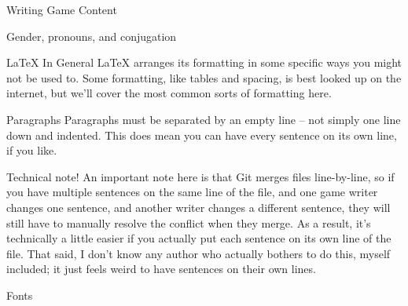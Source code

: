 \documentclass[11pt]{article}
\begin{document}
\begin{section}{Writing Game Content}
\begin{subsection}{Gender, pronouns, and conjugation}
\end{subsection}
\begin{subsection}{\LaTeX{} In General}
LaTeX arranges its formatting in some specific ways you might not be used to.  Some formatting, like tables and spacing, is best looked up on the internet, but we'll cover the most common sorts of formatting here.

\begin{subsubsection}{Paragraphs}
Paragraphs must be separated by an empty line – not simply one line down and indented.  This does mean you can have every sentence on its own line, if you like.  

Technical note! An important note here is that Git merges files line-by-line, so if you have multiple sentences on the same line of the file, and one game writer changes one sentence, and another writer changes a different sentence, they will still have to manually resolve the conflict when they merge.  As a result, it's technically a little easier if you actually put each sentence on its own line of the file.  That said, I don't know any author who actually bothers to do this, myself included; it just feels weird to have sentences on their own lines.
\end{subsubsection}
\begin{subsubsection}{Fonts}


\end{subsubsection}
\end{subsection}
\end{section}
\end{document}
